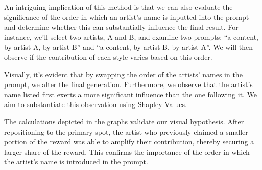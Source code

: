 \documentclass[12pt, letterpaper]{article}
\begin{document}
An intriguing implication of this method is that we can also evaluate the significance of the order in which an artist's name is inputted into the prompt and determine whether this can substantially influence the final result. For instance, we'll select two artists, A and B, and examine two prompts: “a content, by artist A, by artist B” and “a content, by artist B, by artist A”. We will then observe if the contribution of each style varies based on this order.

Visually, it's evident that by swapping the order of the artists' names in the prompt, we alter the final generation. Furthermore, we observe that the artist's name listed first exerts a more significant influence than the one following it. We aim to substantiate this observation using Shapley Values.

The calculations depicted in the graphs validate our visual hypothesis. After repositioning to the primary spot, the artist who previously claimed a smaller portion of the reward was able to amplify their contribution, thereby securing a larger share of the reward. This confirms the importance of the order in which the artist's name is introduced in the prompt.
\end{document}
